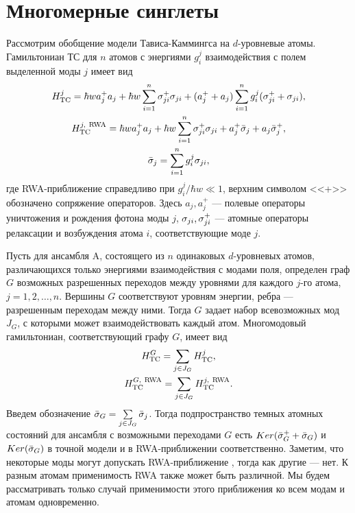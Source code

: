 \clearpage
\section{Многомерные синглеты}\label{sec:ch3/sect2}
Рассмотрим обобщение модели Тависа-Каммингса на $d$-уровневые атомы. Гамильтониан ТС для $n$ атомов с энергиями $g^{j}_{i}$ взаимодействия с полем выделенной моды $j$ имеет вид
\begin{gather}
	H^j_{\text{TC}} = \hbar w a_{j}^{+}a_j + \hbar w \sum\limits_{i=1}^{n}\sigma_{ji}^{+}\sigma_{ji} + (a_{j}^{+} + a_{j})\sum\limits_{i=1}^{n}g^{j}_{i}(\sigma_{ji}^{+} + \sigma_{ji}),\notag\\
	H^{j,\ \text{RWA}}_{\text{TC}} = \hbar w a_{j}^{+}a_{j} + \hbar w \sum\limits_{i=1}^{n}\sigma_{ji}^{+}\sigma_{ji} + a_{j}^{+}\bar{\sigma}_{j} + a_{j}\bar{\sigma}_{j}^{+},\\
	\bar{\sigma}_{j} = \sum\limits_{i=1}^ng^{j}_{i}\sigma_{ji},\notag
\end{gather}
где RWA-приближение \cite{ozhigov_qq,rwa_rabi_1,rwa_rabi_2} справедливо при $g^{j}_{i}/\hbar w\ll 1$, верхним символом <<+>> обозначено сопряжение операторов. Здесь $a_{j},a_{j}^{+}$ --- полевые операторы уничтожения и рождения фотона моды $j$, $\sigma_{ji},\sigma_{ji}^{+}$ --- атомные операторы релаксации и возбуждения атома $i$, соответствующие моде $j$.

Пусть для ансамбля $\text{A}$, состоящего из $n$ одинаковых $d$-уровневых атомов, различающихся только энергиями взаимодействия с модами поля, определен граф $G$ возможных разрешенных переходов между уровнями для каждого $j$-го атома, $j=1,2,\dots,n$. Вершины $G$ соответствуют уровням энергии, ребра --- разрешенным переходам между ними. Тогда $G$ задает набор всевозможных мод $J_{G}$, с которыми может взаимодействовать каждый атом. Многомодовый гамильтониан, соответствующий графу $G$, имеет вид
\begin{gather}
	\label{many}
	H^G_{\text{TC}} = \sum\limits_{j\in J_{G}}H^{j}_{\text{TC}},\notag\\
	H^{G,\ \text{RWA}}_{\text{TC}}=\sum\limits_{j\in J_{G}}H^{j,\ \text{RWA}}_{\text{TC}}\notag.
\end{gather}
Введем обозначение $\bar{\sigma}_{G} = \sum\limits_{j\in J_{G}}\bar{\sigma}_{j}$. 
Тогда подпространство темных атомных состояний для ансамбля с возможными переходами $G$ есть $Ker(\bar{\sigma}_{G}^{+} + \bar{\sigma}_{G})$ и $Ker(\bar{\sigma}_{G})$ в точной модели и в RWA-приближении \cite{ozhigov_qq,rwa_rabi_1,rwa_rabi_2} соответственно. Заметим, что некоторые моды могут допускать RWA-приближение \cite{ozhigov_qq,rwa_rabi_1,rwa_rabi_2}, тогда как другие --- нет. К разным атомам применимость RWA \cite{ozhigov_qq,rwa_rabi_1,rwa_rabi_2} также может быть различной. Мы будем рассматривать только случай применимости этого приближения ко всем модам и атомам одновременно.

